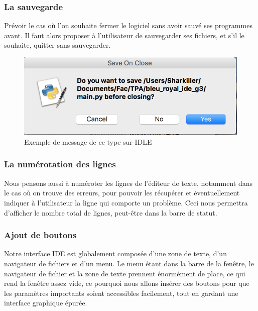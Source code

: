 \documentclass[a4paper,12pt]{article}
\begin{document}
	\subsubsection*{La sauvegarde}
	
		Prévoir le cas où l'on souhaite fermer le logiciel sans avoir sauvé ses programmes avant. Il faut alors proposer à l'utilisateur de sauvegarder ses fichiers, et s'il le souhaite, quitter sans sauvegarder.
		
		\begin{figure}[h!]
			\begin{center}
				\includegraphics[scale=0.5]{images/save_on_close}
				\caption{Exemple de message de ce type sur IDLE}
			\end{center}
		\end{figure}
	
	\subsubsection*{La numérotation des lignes}
	
		Nous pensons aussi à numéroter les lignes de l'éditeur de texte, notamment dans le cas où on trouve des erreurs, pour pouvoir les récupérer et éventuellement indiquer à l'utilisateur la ligne qui comporte un problème. Ceci nous permettra d'afficher le nombre total de lignes, peut-être dans la barre de statut.
		
	\subsubsection*{Ajout de boutons}
		
		Notre interface IDE est globalement composée d'une zone de texte, d'un navigateur de fichiers et d'un menu. Le menu étant dans la barre de la fenêtre, le navigateur de fichier et la zone de texte prennent énormément de place, ce qui rend la fenêtre assez vide, ce pourquoi nous allons insérer des boutons pour que les paramètres importants soient accessibles facilement, tout en gardant une interface graphique épurée.
		
\end{document}
